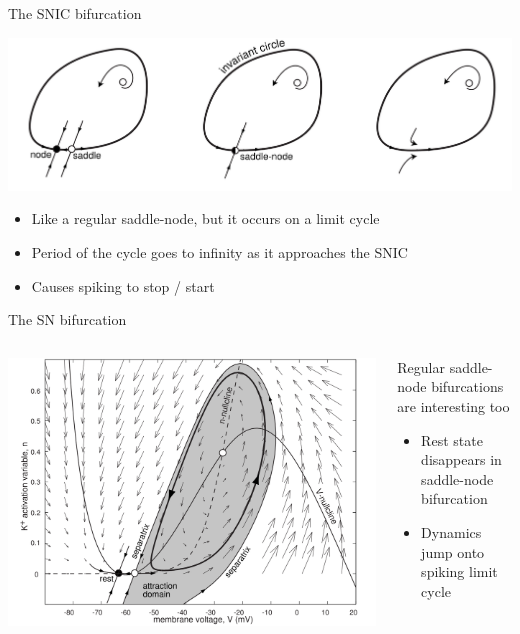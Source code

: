 \documentclass[presentation]{beamer}
\begin{document}
\begin{frame}[label={sec:orgf2cc5dc}]{The SNIC bifurcation}
\begin{center}
\includegraphics[width=\textwidth]{./snic.png}
\end{center}

\begin{itemize}
\item Like a regular saddle-node, but it occurs on a limit cycle
\item Period of the cycle goes to infinity as it approaches the SNIC
\item Causes spiking to stop / start
\end{itemize}
\end{frame}
\begin{frame}[label={sec:org953f777}]{The SN bifurcation}
\begin{columns}
\begin{column}{0.5\columnwidth}
\begin{center}
\includegraphics[width=\textwidth]{./SN.png}
\end{center}
\end{column}

\begin{column}{0.5\columnwidth}
Regular saddle-node bifurcations are interesting too

\begin{itemize}
\item Rest state disappears in saddle-node bifurcation
\item Dynamics jump onto spiking limit cycle
\end{itemize}
\end{column}
\end{columns}
\end{frame}
\end{document}
